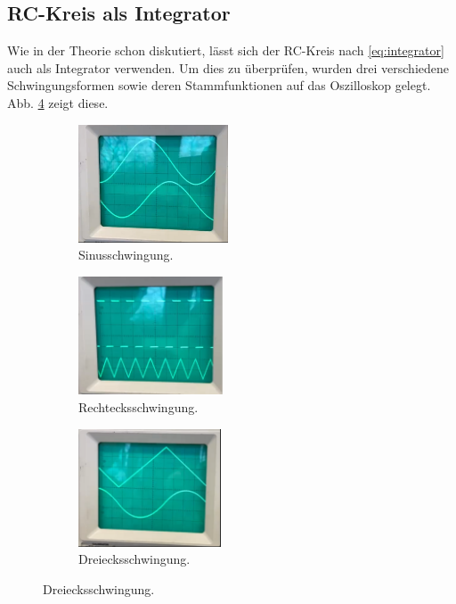 \subsection{RC-Kreis als Integrator}
Wie in der Theorie schon diskutiert, lässt sich der RC-Kreis nach \autoref{eq:integrator} auch als Integrator verwenden. 
Um dies zu überprüfen, wurden drei verschiedene Schwingungsformen sowie deren Stammfunktionen auf das Oszilloskop gelegt.
Abb. \ref{fig:integration} zeigt diese.
\begin{figure}
    \begin{subfigure}{0.32\textwidth}
        \includegraphics[height=3.5cm]{messdaten/cos_int.png}
        \caption{Sinusschwingung.}
        \label{fig:integrationa}
    \end{subfigure}
    \hfill
    \begin{subfigure}{0.32\textwidth}
        \includegraphics[height=3.5cm]{messdaten/dre_int.png}
        \caption{Rechtecksschwingung.}
        \label{fig:integrationb}
    \end{subfigure}
    \hfill
    \begin{subfigure}{0.32\textwidth}
        \includegraphics[height=3.5cm]{messdaten/sin_int.png}
        \caption{Dreiecksschwingung.}
        \label{fig:integrationc}
    \end{subfigure}  
    \label{fig:integration}
\end{figure}
